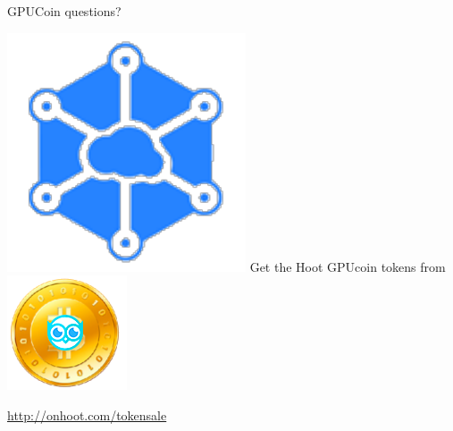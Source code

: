 \documentclass[10pt]{beamer}
\begin{document}
\begin{frame}[standout]{GPUCoin questions?}

\includegraphics[scale=.5]{static/ipcn-p2p}
Get the Hoot GPUcoin tokens from
\includegraphics[scale=0.5]{static/hootcoin} 
 \begin{center}\url{http://onhoot.com/tokensale}\end{center}


 \begin{center}\ccbysa\end{center}

\end{frame}



 
 



% 	
\end{document}
